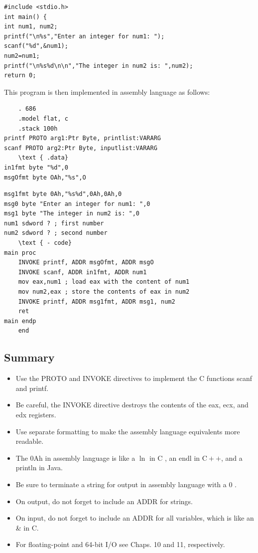 \documentclass[10pt]{article}
\begin{document}
\begin{verbatim}
#include <stdio.h>
int main() {
int num1, num2;
printf("\n%s","Enter an integer for num1: ");
scanf("%d",&num1);
num2=num1;
printf("\n%s%d\n\n","The integer in num2 is: ",num2);
return 0;
\end{verbatim}

This program is then implemented in assembly language as follows:

\begin{verbatim}
    . 686
    .model flat, c
    .stack 100h
printf PROTO arg1:Ptr Byte, printlist:VARARG
scanf PROTO arg2:Ptr Byte, inputlist:VARARG
    \text { .data}
in1fmt byte "%d",0
msgOfmt byte OAh,"%s",O
\end{verbatim}

\begin{verbatim}
msg1fmt byte 0Ah,"%s%d",0Ah,0Ah,0
msg0 byte "Enter an integer for num1: ",0
msg1 byte "The integer in num2 is: ",0
num1 sdword ? ; first number
num2 sdword ? ; second number
    \text { - code}
main proc
    INVOKE printf, ADDR msgOfmt, ADDR msgO
    INVOKE scanf, ADDR in1fmt, ADDR num1
    mov eax,num1 ; load eax with the content of num1
    mov num2,eax ; store the contents of eax in num2
    INVOKE printf, ADDR msg1fmt, ADDR msg1, num2
    ret
main endp
    end
\end{verbatim}

\subsection*{Summary}
\begin{itemize}
  \item Use the PROTO and INVOKE directives to implement the C functions scanf and printf.
  \item Be careful, the INVOKE directive destroys the contents of the eax, ecx, and edx registers.
  \item Use separate formatting to make the assembly language equivalents more readable.
  \item The 0Ah in assembly language is like a $\ln$ in C , an endl in $\mathrm{C}++$, and a println in Java.
  \item Be sure to terminate a string for output in assembly language with a 0 .
  \item On output, do not forget to include an ADDR for strings.
  \item On input, do not forget to include an ADDR for all variables, which is like an \& in C.
  \item For floating-point and 64-bit I/O see Chaps. 10 and 11, respectively.
\end{itemize}
\end{document}
